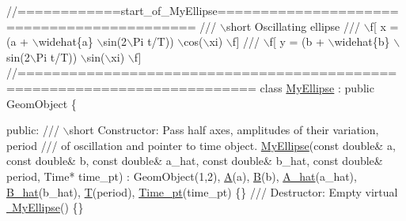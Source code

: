  
\begin{DoxyCodeInclude}
\textcolor{comment}{//============start\_of\_MyEllipse===========================================}
\textcolor{comment}{/// \(\backslash\)short Oscillating ellipse}
\textcolor{comment}{}\textcolor{comment}{/// \(\backslash\)f[ x = (a + \(\backslash\)widehat\{a\} \(\backslash\)sin(2\(\backslash\)Pi t/T)) \(\backslash\)cos(\(\backslash\)xi)  \(\backslash\)f]}
\textcolor{comment}{}\textcolor{comment}{/// \(\backslash\)f[ y = (b + \(\backslash\)widehat\{b\} \(\backslash\)sin(2\(\backslash\)Pi t/T)) \(\backslash\)sin(\(\backslash\)xi)  \(\backslash\)f]}
\textcolor{comment}{}\textcolor{comment}{//=========================================================================}
\textcolor{keyword}{class }\hyperlink{classMyEllipse}{MyEllipse} : \textcolor{keyword}{public} GeomObject
\{

\textcolor{keyword}{public}:
\textcolor{comment}{}
\textcolor{comment}{ /// \(\backslash\)short Constructor:  Pass half axes, amplitudes of their variation, period}
\textcolor{comment}{ /// of oscillation and pointer to time object.}
\textcolor{comment}{} \hyperlink{classMyEllipse_aaa00984813af171e611e420eb3433653}{MyEllipse}(\textcolor{keyword}{const} \textcolor{keywordtype}{double}& a, \textcolor{keyword}{const} \textcolor{keywordtype}{double}& b, 
           \textcolor{keyword}{const} \textcolor{keywordtype}{double}& a\_hat, \textcolor{keyword}{const} \textcolor{keywordtype}{double}& b\_hat, 
           \textcolor{keyword}{const} \textcolor{keywordtype}{double}& period, Time* time\_pt) : 
  GeomObject(1,2), \hyperlink{classMyEllipse_aa2a0efd0a39f9d4fc307a6ff011682ed}{A}(a), \hyperlink{classMyEllipse_a8f991996b9040fe94b942eab7e51f0af}{B}(b), \hyperlink{classMyEllipse_a653e71cf296cdc86cc595d16f18004dd}{A\_hat}(a\_hat), \hyperlink{classMyEllipse_a39d06488447d80f16b80ed8915edf3e3}{B\_hat}(b\_hat), 
  \hyperlink{classMyEllipse_ab098069ab23bbbd8f30b0da3523dc87f}{T}(period), \hyperlink{classMyEllipse_abc1c4c863a599ce87bdff1abb9971953}{Time\_pt}(time\_pt) \{\}
\textcolor{comment}{}
\textcolor{comment}{ /// Destructor: Empty}
\textcolor{comment}{} \textcolor{keyword}{virtual} \hyperlink{classMyEllipse_ac2f2d3fb269c57fb26b4db6d9a0c7c05}{~MyEllipse}() \{\}

\end{DoxyCodeInclude}


